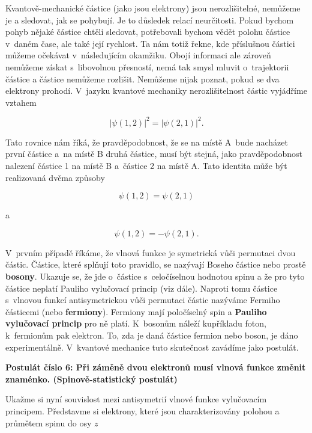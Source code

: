 Kvantově-mechanické částice (jako jsou elektrony) jsou nerozlišitelné, nemůžeme je  a sledovat, jak se pohybují. Je to důsledek relací neurčitosti. Pokud bychom pohyb nějaké částice chtěli sledovat, potřebovali bychom vědět polohu částice v~daném čase, ale také její rychlost. Ta nám totiž řekne, kde příslušnou částici můžeme očekávat v~následujícím okamžiku. Obojí informaci ale zároveň nemůžeme získat s~libovolnou přesností, nemá tak smysl mluvit o~trajektorii částice a částice nemůžeme rozlišit. Nemůžeme nijak poznat, pokud se dva elektrony prohodí. V~jazyku kvantové mechaniky nerozlišitelnost částic vyjádříme vztahem

\begin{equation}
\vert \psi(1,2) \vert^2 = \vert \psi(2,1) \vert^2.
\label{rov:VE-25}
\end{equation}

\noindent Tato rovnice nám říká, že pravděpodobnost, že se na místě A~bude nacházet první částice a~na místě B druhá částice, musí být stejná, jako pravděpodobnost nalezení částice 1 na místě B a~částice 2 na místě A. Tato identita může být realizovaná dvěma způsoby

\begin{equation}
\psi(1,2) = \psi(2,1)
\label{rov:VE-26}
\end{equation}

\noindent a

\begin{equation}
\psi(1,2) = - \psi(2,1).
\label{rov:VE-27}
\end{equation}


\noindent V~prvním případě říkáme, že vlnová funkce je symetrická vůči permutaci dvou částic. Částice, které splňují toto pravidlo, se nazývají Boseho částice nebo prostě \textbf{bosony}. Ukazuje se, že jde o~částice s~celočíselnou hodnotou spinu a že pro tyto částice neplatí Pauliho vylučovací princip (viz dále). Naproti tomu částice s~vlnovou funkcí antisymetrickou vůči permutaci částic nazýváme Fermiho částicemi (nebo \textbf{fermiony}). Fermiony mají poločíselný spin a \textbf{Pauliho vylučovací princip} pro ně platí. K~bosonům náleží kupříkladu foton, k~fermionům pak elektron. To, zda je daná částice fermion nebo boson, je dáno experimentálně. V~kvantové mechanice tuto skutečnost zavádíme jako postulát.

\bigskip
\textbf{Postulát číslo 6: Při záměně dvou elektronů musí vlnová funkce změnit znaménko. (Spinově-statistický postulát)}
\bigskip

Ukažme si nyní souvislost mezi antisymetrií vlnové funkce vylučovacím principem. Představme si elektrony, které jsou charakterizovány polohou a průmětem spinu do osy $z$


